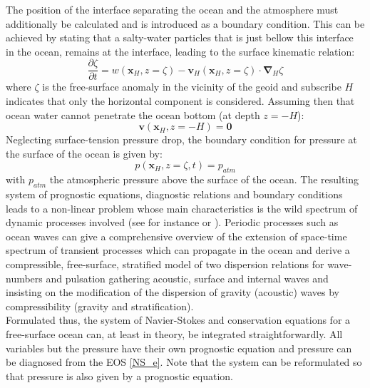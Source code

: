 The position of the interface separating the ocean and the atmosphere must additionally be calculated and is introduced as a boundary condition. This can be achieved by stating that a salty-water particles that is just bellow this interface in the ocean, remains at the interface, leading to the surface kinematic relation:
\begin{equation}
  \displaystyle
  \label{NS_BC2}
  \frac{\partial \zeta}{\partial t}=w(\mathbf{x}_{\scriptscriptstyle H},z=\zeta)-\mathbf{v}_H(\mathbf{x}_{\scriptscriptstyle H},z=\zeta)\cdot\mathbf{\nabla}_H\zeta
\end{equation}
where $\zeta$ is the free-surface anomaly in the vicinity of the geoid and subscribe $H$ indicates that only the horizontal component is considered. Assuming then that ocean water cannot penetrate the ocean bottom (at depth $z=-H$):
\begin{equation}
 \displaystyle
 \label{NS_BC0}
  \mathbf{v}(\mathbf{x}_{\scriptscriptstyle H},z=-H)=\mathbf{0}
\end{equation}
Neglecting surface-tension pressure drop, the boundary condition for pressure at the surface of the ocean is given by:
\begin{equation}
 \displaystyle
 \label{NS_BC1}
  p(\mathbf{x}_{\scriptscriptstyle H},z=\zeta,t)= p_{atm}
\end{equation}
with $p_{atm}$ the atmospheric pressure above the surface of the ocean.
The resulting system of prognostic equations, diagnostic relations and boundary conditions leads to a non-linear problem whose main characteristics is the wild spectrum of dynamic processes involved (see for instance \cite{gill_atmosphere-ocean_1982} or \cite{vallis_atmospheric_2006}). Periodic processes such as ocean waves can give a comprehensive overview of the extension of space-time spectrum of transient processes which can propagate in the ocean and \cite{auclair_modied_2021} derive a compressible, free-surface, stratified model of two dispersion relations for wave-numbers and pulsation gathering acoustic, surface and internal waves and insisting on the modification of the dispersion of gravity (acoustic) waves by compressibility (gravity and stratification).\\
Formulated thus, the system of Navier-Stokes and conservation equations for a free-surface ocean can, at least in theory, be integrated straightforwardly. All variables but the pressure have their own prognostic equation and pressure can be diagnosed from the EOS \ref{NS_e}. Note that the system can be reformulated so that pressure is also given by a prognostic equation.
 
